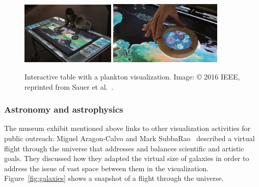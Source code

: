 \documentclass[10pt,journal,compsoc]{IEEEtran}
\begin{document}
\begin{figure}
    \begin{center}    
        \includegraphics[width=0.40\textwidth]{museum1.png} %
        \includegraphics[width=0.48\textwidth]{museum2.png}
        \caption{Interactive table with a plankton visualization. Image: \copyright{} 2016 IEEE, reprinted from Sauer et al.~\cite{Sauer2016}. 
  \label{fig:museum}}        
    \end{center}
\end{figure}



\subsubsection{Astronomy and astrophysics}


The museum exhibit mentioned above links to other visualization activities for public outreach: 
Miguel Aragon-Calvo and Mark SubbaRao~\cite{Aragon-Calvo2015} described a virtual flight through the universe that addresses and balances scientific and artistic goals. They discussed how they adapted the virtual size of galaxies in order to address the issue of vast space between them in the visualization. Figure~\ref{fig:galaxies} shows a snapshot of a flight through the universe.
\end{document}
